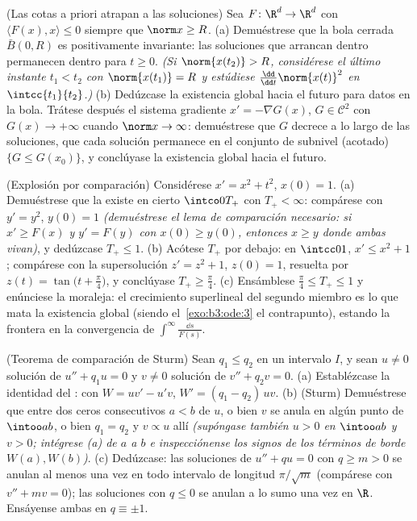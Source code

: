 \begin{exercise}[$\star\star\star$]\label{exo:b3:ode:10}
(Las cotas a priori atrapan a las soluciones) Sea
$F \colon \R^d \to \R^d$  con $\langle F(x), x\rangle \leq 0$ siempre que
$\norm x \geq R$. (a) Demuéstrese que la bola cerrada $\bar B(0, R)$ es
positivamente invariante: las soluciones que arrancan dentro permanecen
dentro para $t \geq
0$. \emph{(Si $\norm{x(t_2)} > R$, considérese el último instante
$t_1 < t_2$ con $\norm{x(t_1)} = R$ y estúdiese
$\frac{\dd}{\dd t}\norm{x(t)}^2$ en $\intcc{t_1}{t_2}$.)} (b) Dedúzcase
la existencia global hacia el futuro para datos en la bola. Trátese
después el sistema gradiente $x' = -\nabla G(x)$, $G \in
\mathcal C^2$ con $G(x) \to +\infty$ cuando $\norm x \to
\infty$: demuéstrese que $G$ decrece a lo largo de las soluciones, que
cada solución permanece en el conjunto de subnivel (acotado) $\{G \leq
G(x_0)\}$, y conclúyase la existencia global hacia el futuro.
\end{exercise}

\begin{exercise}[$\star\star$]\label{exo:b3:ode:11}
(Explosión por comparación) Considérese $x' = x^2 + t^2$, $x(0) =
1$. (a) Demuéstrese que la 
existe en cierto $\intco0{T_+}$ con $T_+ < \infty$: compárese con
$y' = y^2$, $y(0) = 1$ \emph{(demuéstrese el lema de comparación
necesario: si $x' \geq
F(x)$ y $y' = F(y)$ con $x(0) \geq y(0)$, entonces $x \geq
y$ donde ambas vivan)}, y dedúzcase $T_+ \leq 1$. (b) Acótese $T_+$ por
debajo: en $\intcc01$, $x' \leq x^2 +
1$; compárese con la supersolución $z' = z^2 + 1$, $z(0) =
1$, resuelta por $z(t) = \tan\bigl(t + \frac\pi4\bigr)$, y conclúyase
$T_+ \geq \frac\pi4$. (c) Ensámblese $\frac\pi4 \leq T_+ \leq 1$ y
enúnciese la moraleja: el crecimiento superlineal del segundo miembro es
lo que mata la existencia global (siendo el~\cref{exo:b3:ode:3} el
contrapunto), estando la frontera en la convergencia de
$\int^{\infty}\frac{\dd s}{F(s)}$.
\end{exercise}

\begin{exercise}[$\star\star\star$]\label{exo:b3:ode:12}
(Teorema de comparación de Sturm) Sean $q_1 \leq q_2$
 en un intervalo $I$, y
sean $u \neq 0$ solución de $u''
+ q_1u = 0$ y $v \neq 0$ solución de $v'' + q_2v = 0$. (a) Establézcase
la identidad del : con
$W = uv' - u'v$,
$W' = (q_1 - q_2)\,uv$.
(b) (Sturm) Demuéstrese que entre dos ceros consecutivos $a < b$ de $u$,
o bien $v$ se anula en algún punto de $\intoo ab$, o bien $q_1 = q_2$ y
$v \propto u$ allí \emph{(supóngase también $u > 0$ en $\intoo ab$ y
$v > 0$; intégrese (a) de $a$ a $b$ e inspecciónense los signos de los
términos de borde $W(a),
W(b)$)}. (c) Dedúzcase: las soluciones de $u'' + qu = 0$ con
$q \geq m > 0$ se anulan al menos una vez en todo intervalo de longitud
$\pi/\sqrt m$ (compárese con $v'' + mv = 0$); las soluciones con
$q \leq 0$ se anulan a lo sumo una vez en $\R$. Ensáyense ambas en
$q \equiv \pm1$.
\end{exercise}

